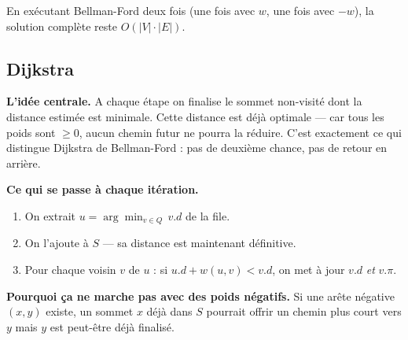 \documentclass[11pt,a4paper,openany]{book}
\begin{document}
En exécutant Bellman-Ford deux fois (une fois avec $w$, une fois avec $-w$), la solution complète reste $O(|V| \cdot |E|)$.

\subsection{Dijkstra}

\begin{exbox}[title=Ce qu'il faut retenir]
\small\raggedright

\textbf{L'idée centrale.}
A chaque étape on finalise le sommet non-visité dont la distance
estimée est minimale. Cette distance est déjà optimale — car tous les poids sont
$\geq 0$, aucun chemin futur ne pourra la réduire.
C'est exactement ce qui distingue Dijkstra de Bellman-Ford : pas de deuxième chance,
pas de retour en arrière.

\textbf{Ce qui se passe à chaque itération.}
\begin{enumerate}
  \item On extrait $u = \arg\min_{v \in Q}\, v.d$ de la file.
  \item On l'ajoute à $S$ — sa distance est maintenant définitive.
  \item Pour chaque voisin $v$ de $u$ : si $u.d + w(u,v) < v.d$, on met à jour
        $v.d$ \emph{et} $v.\pi$.
\end{enumerate}

\textbf{Pourquoi ça ne marche pas avec des poids négatifs.}
Si une arête négative $(x, y)$ existe, un sommet $x$ déjà dans $S$ pourrait offrir un
chemin plus court vers $y$ mais $y$ est peut-être déjà finalisé.

\end{exbox}
\end{document}
